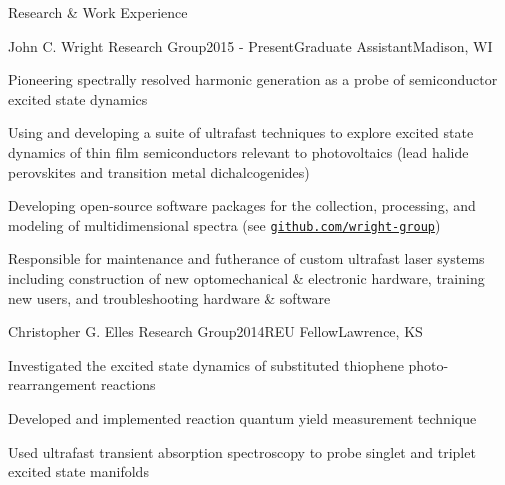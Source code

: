 \documentclass{resume} %
\begin{document}
\begin{rSection}{Research \& Work Experience}

\begin{rSubsection}{John C. Wright Research Group}{2015 - Present}{Graduate Assistant}{Madison, WI}
\item Pioneering spectrally resolved harmonic generation as a probe of semiconductor excited state dynamics
\item Using and developing a suite of ultrafast techniques to explore excited state dynamics of thin film semiconductors relevant to photovoltaics (lead halide perovskites and transition metal dichalcogenides)%
\item Developing open-source software packages for the  collection, processing, and modeling of multidimensional spectra (see \href{http://github.com/wright-group}{\texttt{github.com/wright-group}})
\item Responsible for maintenance and futherance of custom ultrafast laser systems including construction of new optomechanical \& electronic hardware, training new users, and troubleshooting hardware \& software

\end{rSubsection}

\begin{rSubsection}{Christopher G. Elles Research Group}{2014}{REU Fellow}{Lawrence, KS}
	\item Investigated the excited state dynamics of substituted thiophene photo-rearrangement reactions
	\item Developed and implemented reaction quantum yield measurement technique
	\item Used ultrafast transient absorption spectroscopy to probe singlet and triplet excited state manifolds
\end{rSubsection}


\end{rSection}
\end{document}
